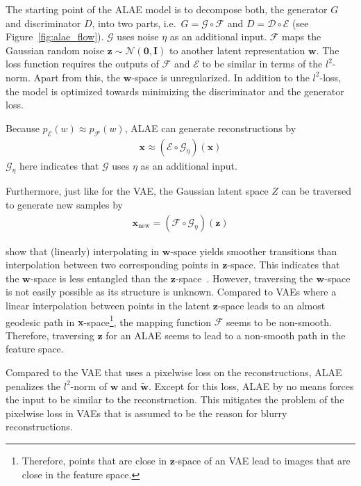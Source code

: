 The starting point of the \ac{ALAE} model is to decompose both, the generator $G$ and discriminator $D$, into two parts, i.e.~$G=\mathcal{G}\circ \mathcal{F}$ and $D=\mathcal{D}\circ \mathcal{E}$ (see Figure~\ref{fig:alae_flow}).
$\mathcal{G}$ uses noise $\eta$ as an additional input.
$\mathcal{F}$ maps the Gaussian random noise $\bm{z} \sim \mathcal{N}(\bm{0}, \bm{I})$ to another latent representation $\bm{w}$.
The loss function requires the outputs of $\mathcal{F}$ and $\mathcal{E}$ to be similar in terms of the $l^2$-norm.
Apart from this, the $\bm{w}$-space is unregularized.
In addition to the $l^2$-loss, the model is optimized towards minimizing the discriminator and the generator loss.

Because $p_{\mathcal{E}}(w) \approx p_{\mathcal{F}}(w)$, \ac{ALAE} can generate reconstructions by
\begin{align}
    \bm{x}\approx (\mathcal{E}\circ \mathcal{G}_\eta)(\bm{x})
\end{align}
$\mathcal{G}_\eta$ here indicates that $\mathcal{G}$ uses $\eta$ as an additional input.

Furthermore, just like for the \ac{VAE}, the Gaussian latent space $Z$ can be traversed to generate new samples by
\begin{align}
    \bm{x}_{\text{new}} = (\mathcal{F}\circ \mathcal{G}_\eta)(\bm{z})
\end{align}

\citet{pidhorskyi2020adversarial} show that (linearly) interpolating in $\bm{w}$-space yields smoother transitions than interpolation between two corresponding points in $\bm{z}$-space.
This indicates that the $\bm{w}$-space is less entangled than the $\bm{z}$-space~\citep{shao2018riemannian,arvanitidis2017latent}.
However, traversing the $\bm{w}$-space is not easily possible as its structure is unknown.
Compared to \acp{VAE} where a linear interpolation between points in the latent $\bm{z}$-space leads to an almost geodesic path in $\bm{x}$-space\footnote{Therefore, points that are close in $\bm{z}$-space of an \ac{VAE} lead to images that are close in the feature space.}, the mapping function $\mathcal{F}$ seems to be non-smooth.
Therefore, traversing $\bm{z}$ for an \ac{ALAE} seems to lead to a non-smooth path in the feature space.

Compared to the \ac{VAE} that uses a pixelwise loss on the reconstructions, \ac{ALAE} penalizes the $l^2$-norm of $\bm{w}$ and $\tilde{\bm{w}}$.
Except for this loss, \ac{ALAE} by no means forces the input to be similar to the reconstruction.
This mitigates the problem of the pixelwise loss in \acp{VAE} that is assumed to be the reason for blurry reconstructions.

